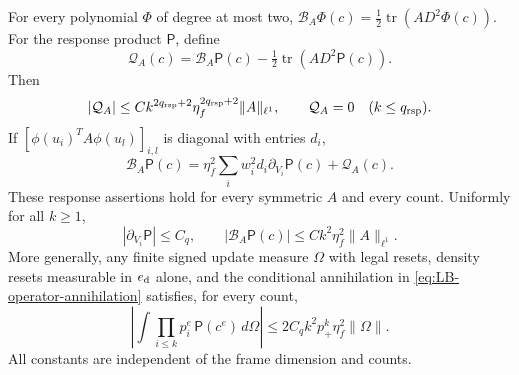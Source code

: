 \begin{lemma}
For every polynomial $\Phi$ of degree at most two,
$\mathcal B_A\Phi(c)=\tfrac12\operatorname{tr}(A D^2\Phi(c))$.
For the response product $\mathsf P$, define
\[
 \mathcal Q_A(c)=\mathcal B_A\mathsf P(c)
              -\tfrac12\operatorname{tr}(A D^2\mathsf P(c)).
\]
Then
\begin{equation}\label{eq:LB-response-error}
 |\mathcal Q_A|\le Ck^{2q_{\rm rsp}+2}\eta_f^{2q_{\rm rsp}+2}
                         \|A\|_{\ell^1},\qquad
 \mathcal Q_A=0\quad(k\le q_{\rm rsp}).
\end{equation}
If $[\phi(u_i)^TA\phi(u_l)]_{i,l}$ is diagonal with entries $d_i$,
\begin{equation}\label{eq:LB-loc-heat}
 \mathcal B_A\mathsf P(c)
 =\eta_f^2\sum_iw_i^2d_i\partial_{V_i}\mathsf P(c)+\mathcal Q_A(c).
\end{equation}
These response assertions hold for every symmetric $A$ and every count.
Uniformly for all $k\ge1$,
\begin{equation}\label{eq:LB-matrix-response-bound}
 |\partial_{V_i}\mathsf P|\le C_q,\qquad
 |\mathcal B_A\mathsf P(c)|\le Ck^2\eta_f^2\|A\|_{\ell^1}.
\end{equation}
More generally, any finite signed update measure $\Omega$ with legal
resets, density resets measurable in $e_{\rm d}$ alone, and the conditional annihilation in
\eqref{eq:LB-operator-annihilation} satisfies, for every count,
\begin{equation}\label{eq:LB-all-count-update}
 \left|\int\prod_{i\le k}p_i^e\,\mathsf P(c^e)\,d\Omega\right|
 \le2C_qk^2p_+^k\eta_f^2\|\Omega\|.
\end{equation}
All constants are independent of the frame dimension and counts.
\end{lemma}

